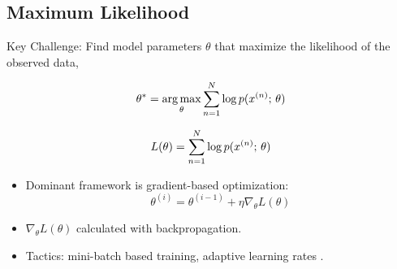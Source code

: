 
\subsection{Maximum Likelihood}

\begin{frame}
 Key Challenge: Find model parameters $\theta$ that maximize the likelihood of the observed data,
        
    \[ \theta^* = \argmax_\theta\sum_{n=1}^N \log p(x^{(n)} \param \theta) \]

\end{frame}

\begin{frame}

    \[  L(\theta) =  \sum_{n=1}^N \log p(x^{(n)} ; \, \theta)  \]
    
        \begin{center}
\end{center}
    \begin{itemize}
        \item Dominant framework is gradient-based optimization: 
        \[ \theta^{(i)} = \theta^{(i-1)} + \eta \nabla_\theta L(\theta)\]
        \item $\nabla_\theta L(\theta)$ calculated with backpropagation.
        \item Tactics: mini-batch based training, adaptive learning rates \citep{duchi2011,Kingma2015}.
    \end{itemize}
\end{frame}

